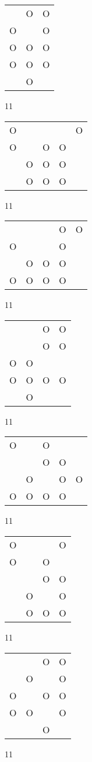 \begin{tabular}{|m{0.2cm}m{0.2cm}m{0.2cm}|}\hline
 &O&O\\
O& &O\\
O&O&O\\
O&O&O\\
 &O& \\
\hline\end{tabular}11
\begin{tabular}{|m{0.2cm}m{0.2cm}m{0.2cm}m{0.2cm}m{0.2cm}|}\hline
O& & & &O\\
O& &O&O& \\
 &O&O&O& \\
 &O&O&O& \\
\hline\end{tabular}11
\begin{tabular}{|m{0.2cm}m{0.2cm}m{0.2cm}m{0.2cm}m{0.2cm}|}\hline
 & & &O&O\\
O& & &O& \\
 &O&O&O& \\
O&O&O&O& \\
\hline\end{tabular}11
\begin{tabular}{|m{0.2cm}m{0.2cm}m{0.2cm}m{0.2cm}|}\hline
 & &O&O\\
 & &O&O\\
O&O& & \\
O&O&O&O\\
 &O& & \\
\hline\end{tabular}11
\begin{tabular}{|m{0.2cm}m{0.2cm}m{0.2cm}m{0.2cm}m{0.2cm}|}\hline
O& &O& & \\
 & &O&O& \\
 &O& &O&O\\
O&O&O&O& \\
\hline\end{tabular}11
\begin{tabular}{|m{0.2cm}m{0.2cm}m{0.2cm}m{0.2cm}|}\hline
O& & &O\\
O& &O& \\
 & &O&O\\
 &O& &O\\
 &O&O&O\\
\hline\end{tabular}11
\begin{tabular}{|m{0.2cm}m{0.2cm}m{0.2cm}m{0.2cm}|}\hline
 & &O&O\\
 &O& &O\\
O& &O&O\\
O&O& &O\\
 & &O& \\
\hline\end{tabular}11
